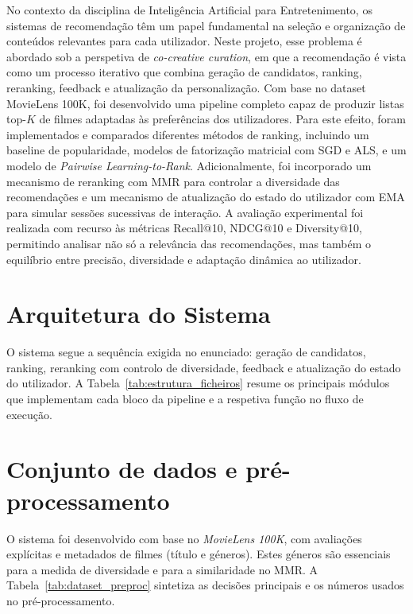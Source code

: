 \documentclass[10pt]{article}
\begin{document}
No contexto da disciplina de Inteligência Artificial para Entretenimento, os sistemas de recomendação têm um papel fundamental na seleção e organização de conteúdos relevantes para cada utilizador. Neste projeto, esse problema é abordado sob a perspetiva de \textit{co-creative curation}, em que a recomendação é vista como um processo iterativo que combina geração de candidatos, ranking, reranking, feedback e atualização da personalização. Com base no dataset MovieLens 100K, foi desenvolvido uma pipeline completo capaz de produzir listas top-$K$ de filmes adaptadas às preferências dos utilizadores. Para este efeito, foram implementados e comparados diferentes métodos de ranking, incluindo um baseline de popularidade, modelos de fatorização matricial com SGD e ALS, e um modelo de \textit{Pairwise Learning-to-Rank}. Adicionalmente, foi incorporado um mecanismo de reranking com MMR para controlar a diversidade das recomendações e um mecanismo de atualização do estado do utilizador com EMA para simular sessões sucessivas de interação. A avaliação experimental foi realizada com recurso às métricas Recall@10, NDCG@10 e Diversity@10, permitindo analisar não só a relevância das recomendações, mas também o equilíbrio entre precisão, diversidade e adaptação dinâmica ao utilizador.

\section{Arquitetura do Sistema}

O sistema segue a sequência exigida no enunciado: geração de candidatos, ranking, reranking com controlo de diversidade, feedback e atualização do estado do utilizador. A Tabela~\ref{tab:estrutura_ficheiros} resume os principais módulos que implementam cada bloco da pipeline e a respetiva função no fluxo de execução.



\section{Conjunto de dados e pré-processamento}

O sistema foi desenvolvido com base no \textit{MovieLens 100K}, com avaliações explícitas e metadados de filmes (título e géneros). Estes géneros são essenciais para a medida de diversidade e para a similaridade no MMR. A Tabela~\ref{tab:dataset_preproc} sintetiza as decisões principais e os números usados no pré-processamento.
\end{document}
